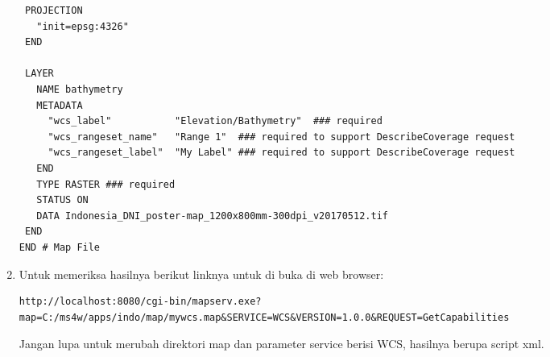\begin{enumerate}
\begin{lstlisting}
 PROJECTION
   "init=epsg:4326"
 END

 LAYER
   NAME bathymetry
   METADATA
     "wcs_label"           "Elevation/Bathymetry"  ### required
     "wcs_rangeset_name"   "Range 1"  ### required to support DescribeCoverage request
     "wcs_rangeset_label"  "My Label" ### required to support DescribeCoverage request
   END
   TYPE RASTER ### required
   STATUS ON
   DATA Indonesia_DNI_poster-map_1200x800mm-300dpi_v20170512.tif
 END
END # Map File
\end{lstlisting}

\item Untuk memeriksa hasilnya berikut linknya untuk di buka di web browser:
\begin{lstlisting}
http://localhost:8080/cgi-bin/mapserv.exe?map=C:/ms4w/apps/indo/map/mywcs.map&SERVICE=WCS&VERSION=1.0.0&REQUEST=GetCapabilities
\end{lstlisting}

Jangan lupa untuk merubah direktori map dan parameter service berisi WCS, hasilnya berupa script xml.
\end{enumerate}

